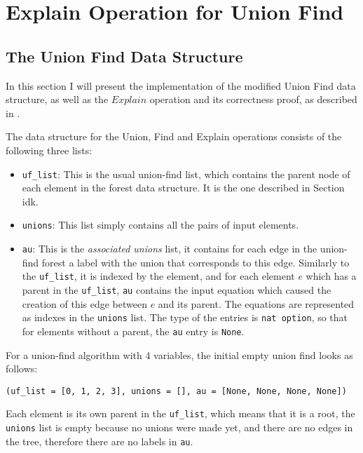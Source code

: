 
\chapter{Explain Operation for Union Find}\label{chapter:union_find}

\section{The Union Find Data Structure}


In this section I will present the implementation of the modified Union Find data structure, as well as the $Explain$ operation and its correctness proof, as described in \cite{Nieuwenhuis}.

The data structure for the Union, Find and Explain operations consists of the following three lists:

\begin{itemize}
	\item \lstinline{uf_list}: This is the usual union-find list, which contains the parent node of each element in the forest data structure. It is the one described in Section idk.
	
	\item \lstinline{unions}: This list simply contains all the pairs of input elements. 
	
	\item \lstinline{au}: This is the \emph{associated unions} list,  it contains for each edge in the union-find forest a label with the union that corresponds to this edge. Similarly to the \lstinline{uf_list}, it is indexed by the element, and for each element $e$ which has a parent in the \lstinline{uf_list}, \lstinline{au} contains the input equation which caused the creation of this edge between $e$ and its parent. The equations are represented as indexes in the \lstinline{unions} list. The type of the entries is \lstinline{nat option}, so that for elements without a parent, the \lstinline{au} entry is \lstinline{None}.
\end{itemize}

\begin{exmp}\label{empty_ufe}
For a union-find algorithm with 4 variables, the initial empty union find looks as follows: 
\begin{lstlisting}
(uf_list = [0, 1, 2, 3], unions = [], au = [None, None, None, None])
\end{lstlisting}
Each element is its own parent in the \lstinline{uf_list}, which means that it is a root, the \lstinline{unions} list is empty because no unions were made yet, and there are no edges in the tree, therefore there are no labels in \lstinline{au}.
\end{exmp}

